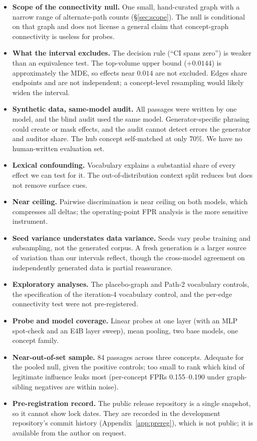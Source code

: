 \documentclass[11pt]{article}
\begin{document}
\begin{itemize}
  \item \textbf{Scope of the connectivity null.} One small, hand-curated graph with a narrow range of alternate-path
        counts (\S\ref{sec:scope}). The null is conditional on that graph and does not license a general claim
        that concept-graph connectivity is useless for probes.
  \item \textbf{What the interval excludes.} The decision rule (``CI spans zero'') is weaker than an equivalence
        test. The top-volume upper bound ($+0.0144$) is approximately the MDE, so effects near $0.014$ are not
        excluded. Edges share endpoints and are not independent; a concept-level resampling would likely widen
        the interval.
  \item \textbf{Synthetic data, same-model audit.} All passages were written by one model, and the blind audit
        used the same model. Generator-specific phrasing could create or mask effects, and the audit cannot
        detect errors the generator and auditor share. The hub concept self-matched at only 70\%. We have no
        human-written evaluation set.
  \item \textbf{Lexical confounding.} Vocabulary explains a substantial share of every effect we can test for it.
        The out-of-distribution context split reduces but does not remove surface cues.
  \item \textbf{Near ceiling.} Pairwise discrimination is near ceiling on both models, which compresses all deltas;
        the operating-point FPR analysis is the more sensitive instrument.
  \item \textbf{Seed variance understates data variance.} Seeds vary probe training and subsampling, not the
        generated corpus. A fresh generation is a larger source of variation than our intervals reflect, though the
        cross-model agreement on independently generated data is partial reassurance.
  \item \textbf{Exploratory analyses.} The placebo-graph and Path-2 vocabulary controls, the specification of the
        iteration-4 vocabulary control, and the per-edge connectivity test were not pre-registered.
  \item \textbf{Probe and model coverage.} Linear probes at one layer (with an MLP spot-check and an E4B layer sweep),
        mean pooling, two base models, one concept family.
  \item \textbf{Near-out-of-set sample.} 84 passages across three concepts. Adequate for the pooled null, given the
        positive controls; too small to rank which kind of legitimate influence leaks most (per-concept FPRs
        0.155--0.190 under graph-sibling negatives are within noise).
  \item \textbf{Pre-registration record.} The public release repository is a single snapshot, so it cannot show lock
        dates. They are recorded in the development repository's commit history (Appendix~\ref{app:prereg}),
        which is not public; it is available from the author on request.
\end{itemize}
\end{document}
